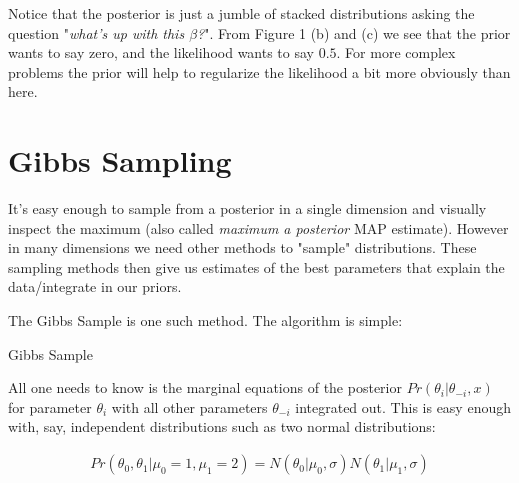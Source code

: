 \documentclass[12pt]{article}
\begin{document}
\vspace{5mm}

Notice that the posterior is just a jumble of stacked distributions asking the question "\emph{what's up with this $\beta$?}". From Figure 1 (b) and (c) we see that the prior wants to say zero, and the likelihood wants to say $0.5$. For more complex problems the prior will help to regularize the likelihood a bit more obviously than here.

\section{Gibbs Sampling}

It's easy enough to sample from a posterior in a single dimension and visually inspect the maximum (also called \emph{maximum a posterior} MAP estimate). However in many dimensions we need other methods to "sample" distributions. These sampling methods then give us estimates of the best parameters that explain the data/integrate in our priors.

\vspace{5mm}

The Gibbs Sample is one such method. The algorithm is simple:

\begin{algorithm}[H]
 \caption{Gibbs Sample}
\end{algorithm}

\vspace{5mm}

All one needs to know is the marginal equations of the posterior $Pr(\theta_i | \theta_{-i},x)$ for parameter $\theta_i$ with all other parameters $\theta_{-i}$ integrated out. This is easy enough with, say, independent distributions such as two normal distributions:

\begin{align*}
Pr(\theta_0,\theta_1 | \mu_0 = 1, \mu_1 = 2) = N(\theta_0 | \mu_0, \sigma)N(\theta_1 | \mu_1, \sigma)
\end{align*}
\end{document}
